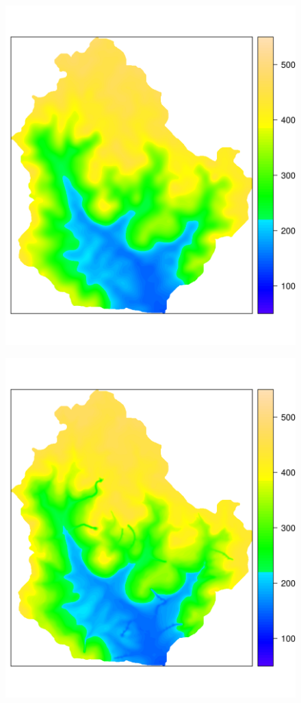 \begin{figure}[!ht]
\centering
\begin{minipage}[b]{0.45\textwidth}
\subcaption{}
\label{fig:chap05-dem-old}
\centering
\includegraphics[width = \textwidth]{fig/chap05-dem-old}
\end{minipage}
\begin{minipage}[b]{0.45\textwidth}
\subcaption{}
\label{fig:chap05-dem-new}
\centering
\includegraphics[width = \textwidth]{fig/chap05-dem-new}

\end{minipage}
\end{figure}
